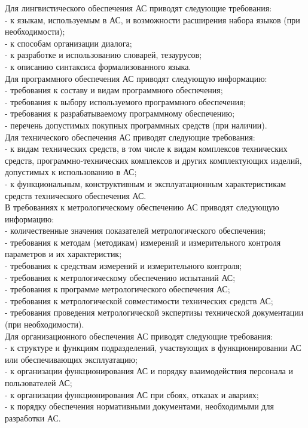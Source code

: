 {Для лингвистического обеспечения АС приводят следующие требования:\\
- к языкам, используемым в АС, и возможности расширения набора языков (при необходимости);\\
- к способам организации диалога; \\
- к разработке и использованию словарей, тезаурусов;\\
- к описанию синтаксиса формализованного языка.\\

Для программного обеспечения АС приводят следующую информацию:\\
- требования к составу и видам программного обеспечения;\\
- требования к выбору используемого программного обеспечения;\\
- требования к разрабатываемому программному обеспечению;\\
- перечень допустимых покупных программных средств (при наличии).\\

Для технического обеспечения АС приводят следующие требования:\\
- к видам технических средств, в том числе к видам комплексов технических средств, программно-технических комплексов и других комплектующих изделий, допустимых к использованию в АС;\\
- к функциональным, конструктивным и эксплуатационным характеристикам средств технического обеспечения АС.\\

В требованиях к метрологическому обеспечению АС приводят следующую информацию:\\
- количественные значения показателей метрологического обеспечения;\\
- требования к методам (методикам) измерений и измерительного контроля параметров и их характеристик;\\
- требования к средствам измерений и измерительного контроля;\\
- требования к метрологическому обеспечению испытаний АС;\\
- требования к программе метрологического обеспечения АС;\\
- требования к метрологической совместимости технических средств АС;\\
- требования проведения метрологической экспертизы технической документации (при необходимости).\\

Для организационного обеспечения АС приводят следующие требования:\\
- к структуре и функциям подразделений, участвующих в функционировании АС или обеспечивающих эксплуатацию;\\
- к организации функционирования АС и порядку взаимодействия персонала и пользователей АС;\\
- к организации функционирования АС при сбоях, отказах и авариях;\\
- к порядку обеспечения нормативными документами, необходимыми для разработки АС.\\

}
